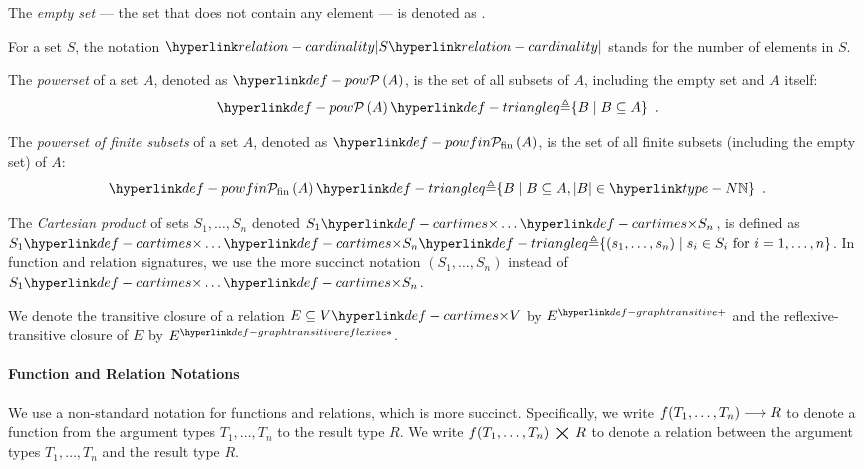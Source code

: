 \begin{definition}
  The \emph{empty set} --- the set that does not contain any element --- is denoted as .
\end{definition}

\hypertarget{relation-cardinality}{}
\begin{definition}
  For a set $S$, the notation $\cardinality{S}$ stands for the number of elements in $S$.
\end{definition}

\hypertarget{def-pow}{}
\begin{definition}[Powerset]
The \emph{powerset} of a set $A$, denoted as $\pow{A}$, is the set of all subsets of $A$, including the empty set and $A$ itself:
\[
    \pow{A} \triangleq \{ B \;|\; B \subseteq A\} \enspace.
\]
\end{definition}

\hypertarget{def-powfin}{}
\begin{definition}
  The \emph{powerset of finite subsets} of a set $A$, denoted as $\powfin{A}$, is the set of all finite subsets (including the empty set) of $A$:
  \[
     \powfin{A} \triangleq \{ B \;|\; B \subseteq A, |B| \in \N\} \enspace.
  \]
\end{definition}

\hypertarget{def-cartimes}{}
\begin{definition}
The \emph{Cartesian product} of sets $S_1,\ldots,S_n$ denoted $S_1 \cartimes \ldots \cartimes S_n$,
is defined as $S_1 \cartimes \ldots \cartimes S_n \triangleq \{(s_1,\ldots,s_n) \;|\; s_i \in S_i \text{ for } i=1,\ldots,n\}$.
%
In function and relation signatures, we use the more succinct notation $(S_1,\ldots,S_n)$
instead of $S_1 \cartimes \ldots \cartimes S_n$.
\end{definition}

\hypertarget{def-graphtransitive}{}
\hypertarget{def-graphtransitivereflexive}{}
\begin{definition}
We denote the transitive closure of a relation $E \subseteq V \cartimes V$ by $\graphtransitive{E}$
and the reflexive-transitive closure of $E$ by $\graphtransitivereflexive{E}$.
\end{definition}

\paragraph{Function and Relation Notations}
We use a non-standard notation for functions and relations, which is more succinct.
Specifically, we write $f(T_1,\ldots,T_n) \longrightarrow R$ to denote a function from
the argument types $T_1,\ldots,T_n$ to the result type $R$.
%
We write $f(T_1,\ldots,T_n) \;\bigtimes\; R$ to denote a relation between the argument types $T_1,\ldots,T_n$ and the result type $R$.

